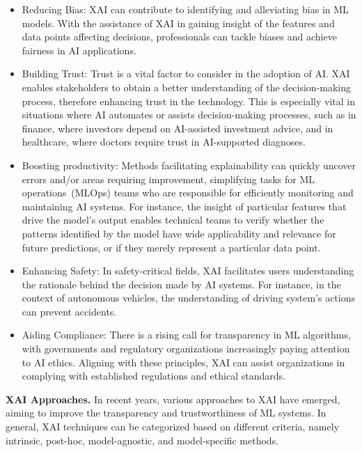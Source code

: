 \begin{itemize}
	\item Reducing Bias:
		XAI can contribute to identifying and alleviating bias
		in ML models.
		With the assistance of XAI in gaining insight of the features and data points
		affecting decisions, professionals can tackle biases and achieve fairness in AI applications.

	\item Building Trust:
		Trust is a vital factor to consider in the adoption of AI.
		XAI enables stakeholders to obtain a better understanding of the decision-making process, 
		therefore enhancing trust in the technology.
		This is especially vital in situations where AI automates or assists decision-making processes, 
		such as in finance, where investors depend on AI-assisted investment advice, 
		and in healthcare, where doctors require trust in AI-supported diagnoses.
	\item Boosting productivity:
		Methods facilitating explainability can quickly uncover errors and/or areas
		requiring improvement, simplifying tasks for ML operations~(MLOps) teams who are responsible for 
		efficiently monitoring and maintaining AI systems.
		For instance, the insight of particular features that drive the model's output 
		enables technical teams to verify whether the patterns identified by the model 
		have wide applicability and relevance for future predictions,
		or if they merely represent a particular data point.
	\item Enhancing Safety:
		In safety-critical fields, XAI facilitates users
		understanding the rationale behind the decision made by
		AI systems.
		For instance, in the context of autonomous vehicles,
		the understanding of driving system's actions can
		prevent accidents.
	\item Aiding Compliance:
		There is a rising call for transparency in ML algorithms,
		with governments and regulatory organizations increasingly paying 
		attention to AI ethics.
		Aligning with these principles, XAI can assist organizations
		in complying with established regulations and ethical standards.
\end{itemize}

\textbf{XAI Approaches.}
In recent years, various approaches to XAI have emerged, aiming to improve the 
transparency and trustworthiness of ML systems. 
%
In general, XAI techniques can be categorized based on different criteria,
namely intrinsic, post-hoc, model-agnostic, and model-specific methods.

